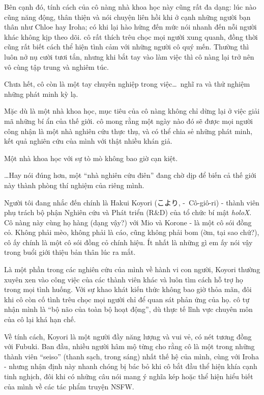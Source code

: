 \documentclass[../main.tex]{subfiles}
\begin{document}
Bên cạnh đó, tính cách của cô nàng nhà khoa học này cũng rất đa dạng: lúc nào cũng năng động, thân thiện và nói chuyện liên hồi khi ở cạnh những người bạn thân như Chloe hay Iroha; có khi lại hào hứng đến mức nói nhanh đến nỗi người khác không kịp theo dõi. cô rất thích trêu chọc mọi người xung quanh, đồng thời cũng rất biết cách thể hiện tình cảm với những người cô quý mến. Thường thì luôn nở nụ cười tươi tắn, nhưng khi bắt tay vào làm việc thì cô nàng lại trở nên vô cùng tập trung và nghiêm túc.

Chưa hết, cô còn là một tay chuyên nghiệp trong việc\dots\ nghĩ ra và thử nghiệm những phát minh kỳ lạ.

Mặc dù là một nhà khoa học, mục tiêu của cô nàng không chỉ dừng lại ở việc giải mã những bí ẩn của thế giới. cô mong rằng một ngày nào đó sẽ được mọi người công nhận là một nhà nghiên cứu thực thụ, và có thể chia sẻ những phát minh, kết quả nghiên cứu của mình với thật nhiều khán giả.

Một nhà khoa học với sự tò mò không bao giờ cạn kiệt.

\dots Hay nói đúng hơn, một ``nhà nghiên cứu điên'' đang chờ dịp để biến cả thế giới này thành phòng thí nghiệm của riêng mình.

\chrint

Người tôi đang nhắc đến chính là Hakui Koyori (こより, -\ Cô-giô-ri) - thành viên phụ trách bộ phận Nghiên cứu và Phát triển (R\&D) của tổ chức bí mật \textit{holoX}. Cô nàng này cùng họ hàng (dạng vậy?) với Mio và Korone - là một cô sói đồng cỏ. Không phải mèo, không phải là cáo, cũng không phải bom (ờm, tại sao chứ?), cô ấy chính là một cô sói đồng cỏ chính hiệu. Ít nhất là những gì em ấy nói vậy trong buổi giới thiệu bản thân lúc ra mắt.


Là một phần trong các nghiên cứu của mình về hành vi con người, Koyori thường xuyên xen vào công việc của các thành viên khác và luôn tìm cách hỗ trợ họ trong mọi tình huống. Với sự khao khát kiến thức không bao giờ thỏa mãn, đôi khi cô còn cố tình trêu chọc mọi người chỉ để quan sát phản ứng của họ. cô tự nhận mình là ``bộ não của toàn bộ hoạt động'', dù thực tế lĩnh vực chuyên môn của cô lại khá hạn chế.

Về tính cách, Koyori là một người đầy năng lượng và vui vẻ, có nét tương đồng với Fubuki. Ban đầu, nhiều người hâm mộ từng cho rằng cô là một trong những thành viên ``seiso'' (thanh sạch, trong sáng) nhất thế hệ của mình, cùng với Iroha - nhưng nhận định này nhanh chóng bị bác bỏ khi cô bắt đầu thể hiện khía cạnh tinh nghịch, đôi khi có những câu nói mang ý nghĩa kép hoặc thể hiện hiểu biết của mình về các tác phẩm truyện NSFW.
\end{document}

